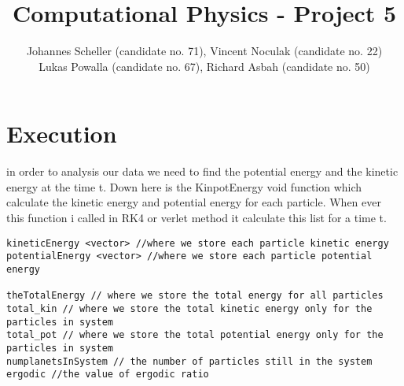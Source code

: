 \documentclass[10pt,a4paper]{article}
\author{Johannes Scheller (candidate no. 71), Vincent Noculak (candidate no. 22)\\ Lukas Powalla (candidate no. 67), Richard Asbah (candidate no. 50) }
\title{Computational Physics - Project 5}
\begin{document}
\maketitle
\newpage
\tableofcontents
\newpage




\section{Execution}

in order to analysis our data we need to find the potential energy and the kinetic energy at the time t. Down here is the KinpotEnergy void function which calculate the kinetic energy and potential energy for each particle. When ever this function i called in RK4 or verlet method it calculate this list for a time t.
\begin{lstlisting}
kineticEnergy <vector> //where we store each particle kinetic energy 
potentialEnergy <vector> //where we store each particle potential energy 

theTotalEnergy // where we store the total energy for all particles
total_kin // where we store the total kinetic energy only for the particles in system
total_pot // where we store the total potential energy only for the particles in system
numplanetsInSystem // the number of particles still in the system
ergodic //the value of ergodic ratio 
\end{lstlisting}
\end{document}
